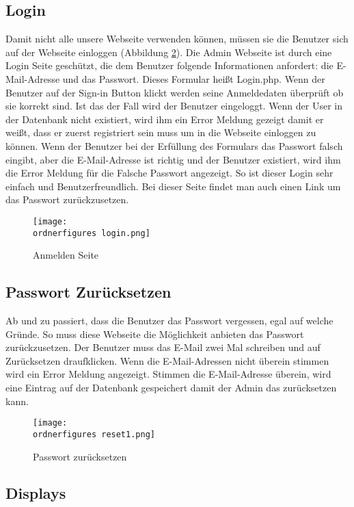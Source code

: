 \subsection{Login}
Damit nicht alle unsere Webseite verwenden können, müssen sie die Benutzer sich auf der Webseite einloggen (Abbildung \ref{fi:login}). Die Admin Webseite ist durch eine Login Seite geschützt, die dem Benutzer folgende Informationen anfordert: die E-Mail-Adresse und das Passwort. Dieses Formular heißt Login.php. Wenn der Benutzer auf der Sign-in Button klickt werden seine Anmeldedaten überprüft ob sie korrekt sind. Ist das der Fall wird der Benutzer eingeloggt. Wenn der User in der Datenbank nicht existiert, wird ihm ein Error Meldung gezeigt damit er weißt, dass er zuerst registriert sein muss um in die Webseite einloggen zu können. Wenn der Benutzer bei der Erfüllung des Formulars das Passwort falsch eingibt, aber die E-Mail-Adresse ist richtig und der Benutzer existiert, wird ihm die Error Meldung für die Falsche Passwort angezeigt. So ist dieser Login sehr einfach und Benutzerfreundlich. Bei dieser Seite findet man auch einen Link um das Passwort zurückzusetzen.

\begin{figure}[H]
	\centering
	\texttt{[image: \\ordnerfigures login.png]}
	\caption{Anmelden Seite}
	\label{fi:login}
\end{figure}

\subsection{Passwort Zurücksetzen}
Ab und zu passiert, dass die Benutzer das Passwort vergessen, egal auf welche Gründe. So muss diese Webseite die Möglichkeit anbieten das Passwort zurückzusetzen. Der Benutzer muss das E-Mail zwei Mal schreiben und auf Zurücksetzen draufklicken. Wenn die E-Mail-Adressen nicht überein stimmen wird ein Error Meldung angezeigt. Stimmen die E-Mail-Adresse überein, wird eine Eintrag auf der Datenbank gespeichert damit der Admin das zurücksetzen kann.
\begin{figure}[H]
	\centering
	\texttt{[image: \\ordnerfigures reset1.png]}
	\caption{Passwort zurücksetzen}
	\label{fi:login}
\end{figure}

\subsection{Displays}




